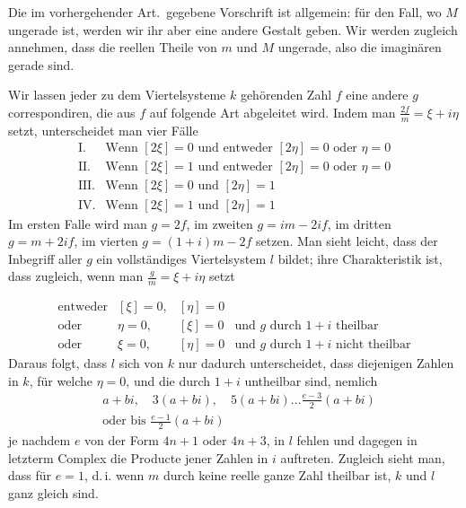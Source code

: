 %
Die im vorhergehender Art.\ gegebene Vorschrift ist allgemein: für den Fall, wo $M$ ungerade ist, werden wir ihr aber eine andere Gestalt geben. Wir werden zugleich annehmen, dass die reellen Theile von $m$ und $M$ ungerade, also die imaginären gerade sind.

Wir lassen jeder zu dem Viertelsysteme $k$ gehörenden Zahl $f$ eine andere $g$ correspondiren, die aus $f$ auf folgende Art abgeleitet wird. Indem man $\frac{2f}{m}=\xi+i\eta$ setzt, unterscheidet man vier Fälle
\[
\begin{array}{ll}
\mathrm{I.}&\text{Wenn }[2\xi]=0\text{ und entweder }[2\eta]=0\text{ oder }\eta=0\\
\mathrm{II.}&\text{Wenn }[2\xi]=1\text{ und entweder }[2\eta]=0\text{ oder }\eta=0\\
\mathrm{III.}&\text{Wenn }[2\xi]=0\text{ und }[2\eta]=1\\
\mathrm{IV.}&\text{Wenn }[2\xi]=1\text{ und }[2\eta]=1
\end{array}
\]
Im ersten Falle wird man $g=2f$, im zweiten $g=im-2if$, im dritten $g=m+2if$, im vierten $g=(1+i)m-2f$ setzen. Man sieht leicht, dass der Inbegriff aller $g$ ein vollständiges Viertelsystem $l$ bildet; ihre Charakteristik ist, dass zugleich, wenn man $\frac gm=\xi+i\eta$ setzt

\[
\begin{array}{llll}
\text{entweder}&[\xi]=0,&[\eta]=0&\\
\text{oder}&\eta=0,&[\xi]=0&\text{und }g\text{ durch }1+i\text{ theilbar}\\
\text{oder}&\xi=0,&[\eta]=0&\text{und }g\text{ durch }1+i\text{ nicht theilbar}
\end{array}
\]
Daraus folgt, dass $l$ sich von $k$ nur dadurch unterscheidet, dass diejenigen Zahlen in $k$, für welche $\eta=0$, und die durch $1+i$ untheilbar sind, nemlich
\[
\begin{aligned}
&a+bi,\quad3(a+bi),\quad5(a+bi)\ldots\frac{e-3}{2}(a+bi)\\
&\text{oder bis }\frac{e-1}{2}(a+bi)
\end{aligned}
\]
je nachdem $e$ von der Form $4n+1$ oder $4n+3$, in $l$ fehlen und dagegen in letzterm Complex die Producte jener Zahlen in $i$ auftreten. Zugleich sieht man, dass für $e=1$, d.\,i. wenn $m$ durch keine reelle ganze Zahl theilbar ist, $k$ und $l$ ganz gleich sind.

